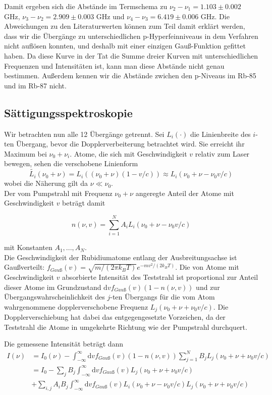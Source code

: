 \documentclass[a4paper,parskip]{scrartcl}
\begin{document}
Damit ergeben sich die Abstände im Termschema zu $\nu_2 - \nu_1 = 1.103 \pm 0.002$ GHz,  $\nu_3 - \nu_2 = 2.909 \pm 0.003$ GHz und $\nu_4 - \nu_3 = 6.419 \pm 0.006$ GHz. Die Abweichungen zu den Literaturwerten können zum Teil damit erklärt werden, dass wir die Übergänge zu unterschiedlichen p-Hyperfeinniveaus in dem Verfahren nicht auflösen konnten, und deshalb mit einer einzigen Gauß-Funktion gefittet haben. Da diese Kurve in der Tat die Summe dreier Kurven mit unterschiedlichen Frequenzen und Intensitäten ist, kann man diese Abstände nicht genau bestimmen. Außerdem kennen wir die Abstände zwichen den p-Niveaus im Rb-85 und im Rb-87 nicht.

\subsection{Sättigungsspektroskopie}

Wir betrachten nun alle 12 Übergänge getrennt. Sei $L_i(\cdot )$ die Linienbreite des $i$-ten Übergang, bevor die Dopplerverbeiterung betrachtet wird. Sie erreicht ihr Maximum bei $\nu_0+\nu_i$. Atome, die sich mit Geschwindigkeit $v$ relativ zum Laser bewegen, sehen die verschobene Linienform
$$\tilde{L_i}(\nu_0+\nu) = L_i((\nu_0+\nu)(1-v/c)) \approx L_i(\nu_0+\nu-\nu_0 v/c)$$
wobei die Näherung gilt da $\nu \ll \nu_0$.\\
  Der vom Pumpstrahl mit Frequenz $\nu_0+\nu$ angeregte Anteil der Atome mit Geschwindigkeit $v$ beträgt damit

$$n(\nu, v) = \sum_{i=1}^N A_i L_i(\nu_0+\nu-\nu_0 v/c)$$

mit Konstanten $A_1, ..., A_N$.\\

Die Geschwindigkeit der Rubidiumatome entlang der Ausbreitungsachse ist Gaußverteilt: $f_{Gauß}(v) = \sqrt{m/(2\pi k_B T)} e^{-mv^2/(2k_BT)}$. Die von Atome mit Geschwindigkeit $v$ absorbierte Intensität des Teststrahl ist proportional zur Anteil dieser Atome im Grundzustand $\mathrm{d}v f_{Gauß}(v)(1-n(\nu, v))$ und zur Übergangswahrscheinlichkeit des $j$-ten Übergangs für die vom Atom wahrgenommene dopplerverschobene Frequenz $L_j(\nu_0+\nu+\nu_0 v/c)$. Die Dopplerverschiebung hat dabei das entgegengesetzte Vorzeichen, da der Teststrahl die Atome in umgekehrte Richtung wie der Pumpstrahl durchquert.

 Die gemessene Intensität beträgt dann
\begin{align*}
I(\nu) &= I_0(\nu)-\int_{-\infty}^{\infty} \mathrm{d}v f_{Gauß}(v)(1-n(\nu, v))\sum_{j=1}^N B_j L_j(\nu_0+\nu+\nu_0 v/c) \\
&= I_0 -\sum_j B_j \int_{-\infty}^{\infty} \mathrm{d}v f_{Gauß}(v) L_j(\nu_0+\nu+\nu_0 v/c) \\
&+\sum_{i,j} A_iB_j \int_{-\infty}^{\infty} \mathrm{d}v f_{Gauß}(v) L_i(\nu_0+\nu-\nu_0 v/c) L_j(\nu_0+\nu+\nu_0 v/c)
\end{align*}
\end{document}
